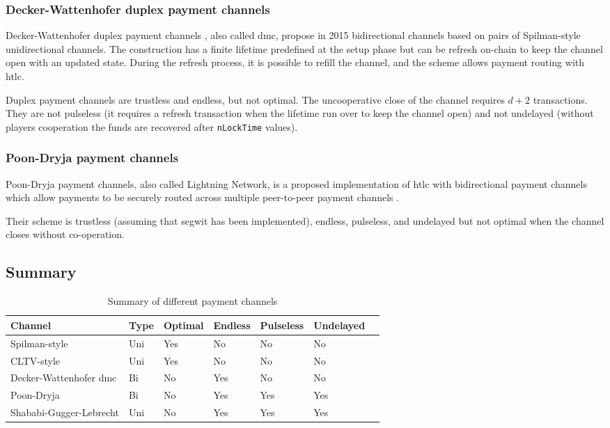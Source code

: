 \subsubsection{Decker-Wattenhofer duplex payment channels}

Decker-Wattenhofer duplex payment channels \cite{Decker2015fast}, also called
\gls{dmc}, propose in 2015 bidirectional channels based on pairs of
Spilman-style unidirectional channels. The construction has a finite lifetime
predefined at the setup phase but can be refresh on-chain to keep the channel
open with an updated state. During the refresh process, it is possible to refill
the channel, and the scheme allows payment routing with \gls{htlc}.

Duplex payment channels are trustless and endless, but not optimal. The
uncooperative close of the channel requires $d + 2$ transactions. They are not
pulseless (it requires a refresh transaction when the lifetime run over to keep
the channel open) and not undelayed (without players cooperation the funds are
recovered after \texttt{nLockTime} values).

\subsubsection{Poon-Dryja payment channels}

Poon-Dryja payment channels, also called Lightning Network, is a proposed
implementation of \gls{htlc} with bidirectional payment channels which allow
payments to be securely routed across multiple peer-to-peer payment channels
\cite{poon2016bitcoin}.

Their scheme is trustless (assuming that \gls{segwit} has been implemented),
endless, pulseless, and undelayed but not optimal when the channel closes
without co-operation.

\subsection{Summary}

\begin{table}[h]
  \begin{tabularx}{\textwidth}{ | X | l | l | l | l | l | l |}
  \hline
  Channel & Type & Optimal & Endless & Pulseless & Undelayed \\ \hline \hline
  Spilman-style & Uni & Yes & No & No & No \\ \hline
  CLTV-style & Uni & Yes & No & No & No \\ \hline
  Decker-Wattenhofer \gls{dmc} & Bi & No & Yes & No & No \\ \hline
  Poon-Dryja & Bi & No & Yes & Yes & Yes \\ \hline
  Shababi-Gugger-Lebrecht & Uni & No & Yes & Yes & Yes \\
  \hline
  \end{tabularx}
  \caption{Summary of different payment channels}
  \label{fig:summaryPaymentChannel}
\end{table}

